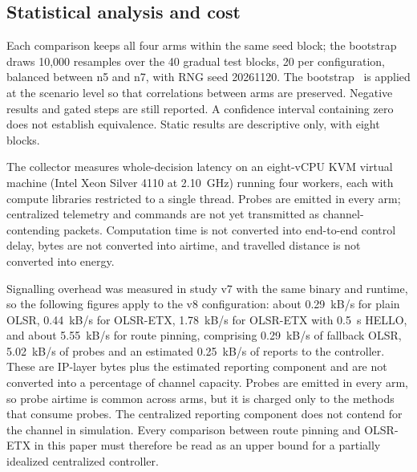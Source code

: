 \subsection{Statistical analysis and cost}
Each comparison keeps all four arms within the same seed block; the bootstrap
draws 10{,}000 resamples over the 40 gradual test blocks, 20 per configuration,
balanced between n5 and n7, with RNG seed 20261120. The
bootstrap~\cite{efron1993} is applied at the scenario level so that correlations
between arms are preserved. Negative results and gated steps are still
reported. A confidence interval containing zero does not establish equivalence.
Static results are descriptive only, with eight blocks.

The collector measures whole-decision latency on an eight-vCPU KVM virtual
machine (Intel Xeon Silver 4110 at 2.10~GHz) running four workers, each with
compute libraries restricted to a single thread. Probes are emitted in every
arm; centralized telemetry and commands are not yet transmitted as
channel-contending packets. Computation time is not converted into end-to-end
control delay, bytes are not converted into airtime, and travelled distance is
not converted into energy.

Signalling overhead was measured in study v7 with the same binary and runtime,
so the following figures apply to the v8 configuration: about 0.29~kB/s for
plain OLSR, 0.44~kB/s for OLSR-ETX, 1.78~kB/s for OLSR-ETX with 0.5~s HELLO, and
about 5.55~kB/s for route pinning, comprising 0.29~kB/s of fallback OLSR,
5.02~kB/s of probes and an estimated 0.25~kB/s of reports to the controller.
These are IP-layer bytes plus the estimated reporting component and are not
converted into a percentage of channel capacity. Probes are emitted in every
arm, so probe airtime is common across arms, but it is charged only to the
methods that consume probes. The centralized reporting component does not
contend for the channel in simulation. Every comparison between route pinning
and OLSR-ETX in this paper must therefore be read as an upper bound for a
partially idealized centralized controller.
